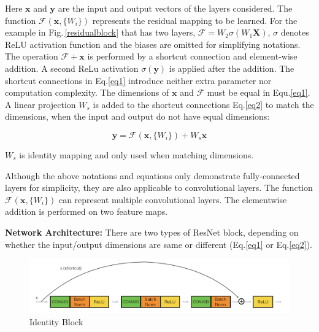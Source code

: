 Here $\mathbf{x}$ and $\mathbf{y}$ are the input and output vectors of the layers considered. The function $\mathcal{F} (\mathbf{x}, \{W_i\})$ represents the residual mapping to be learned. For the example in Fig.\,\ref{residualblock} that has two layers, $\mathcal{F}=W_2\sigma(W_1\mathbf{X})$, $\sigma$ denotes ReLU activation function and the biases are omitted for simplifying notations. The operation $\mathcal{F} + \mathbf{x}$ is performed by a shortcut connection and element-wise addition. A second ReLu activation $\sigma(\mathbf{y})$ is applied after the addition. The shortcut connections in Eq.\ref{eq1} introduce neither extra parameter nor computation complexity. The dimensions of $\mathbf{x}$ and $\mathcal{F}$ must be equal in Equ.\ref{eq1}. A linear projection $W_s$ is added to the shortcut connections Eq.\ref{eq2} to match the dimensions, when the input and output do not have equal dimensions: 

\begin{equation} \label{eq2}
\mathbf{y} = \mathcal{F} (\mathbf{x}, \{W_i\}) + W_s \mathbf{x}
\end{equation}

$W_s$ is identity mapping and only used when matching dimensions. 

Although the above notations and equations only demonstrate fully-connected layers for simplicity, they are also applicable to convolutional layers. The function $\mathcal{F} (\mathbf{x}, \{W_i\})$ can represent multiple convolutional layers. The elementwise addition is performed on two feature maps.

\textbf{Network Architecture:}
There are two types of ResNet block, depending on whether the input/output dimensions are same or different (Eq.\ref{eq1} or Eq.\ref{eq2}).

\begin{figure}[h]
	\centering
	\includegraphics[width=\textwidth]{Figs/identityblock.png}
    \caption{Identity Block}
    \label{identityblock}
\end{figure}

